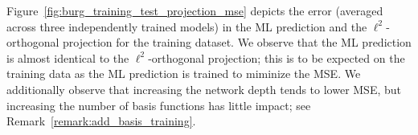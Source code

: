 \documentclass[3p,computermodern,10pt]{elsarticle}
\begin{document}
%
%
%

Figure~\ref{fig:burg_training_test_projection_mse} depicts the error (averaged across three independently trained models) in the ML prediction and the $\ell^2$-orthogonal projection for the training dataset. We observe that the ML prediction is almost identical to the $\ell^2$-orthogonal projection; this is to be expected on the training data as the ML prediction is trained to miminize the MSE. We additionally observe that increasing the network depth tends to lower MSE, but increasing the number of basis functions has little impact; see Remark~\ref{remark:add_basis_training}.
\end{document}
